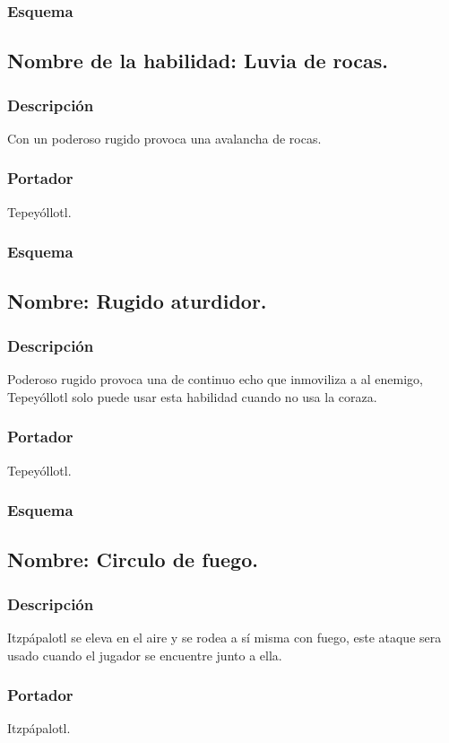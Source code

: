 \documentclass[11pt,letterpaper]{article}
\begin{document}
\subsubsection{Esquema}
\subsection{Nombre de la habilidad: Luvia de rocas.}
\subsubsection{Descripción}
Con un poderoso rugido provoca una avalancha de rocas. 
\subsubsection{Portador}
Tepeyóllotl.
\subsubsection{Esquema}
\subsection{Nombre: Rugido aturdidor.}
\subsubsection{Descripción}
Poderoso rugido provoca una de continuo echo que inmoviliza a al enemigo, Tepeyóllotl solo puede usar esta habilidad cuando no usa la coraza. 
\subsubsection{Portador}
Tepeyóllotl. 
\subsubsection{Esquema}
\subsection{Nombre: Circulo de fuego.}
\subsubsection{Descripción}
Itzpápalotl se eleva en el aire y se rodea a sí misma con fuego, este ataque sera usado cuando el jugador se encuentre junto a ella.
\subsubsection{Portador}
Itzpápalotl. 
\end{document}
